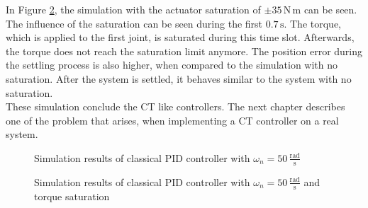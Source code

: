 In Figure \ref{fig:ch3_sim33}, the simulation with the actuator saturation of $\pm 35\,\mathrm{N\,m}$ can be seen. The influence of the saturation can be seen during the first $0.7\,\mathrm{s}$. The torque, which is applied to the first joint, is saturated during this time slot. Afterwards, the torque does not reach the saturation limit anymore. The position error during the settling process is also higher, when compared to the simulation with no saturation. After the system is settled, it behaves similar to the system with no saturation.\\
These simulation conclude the \ac{CT} like controllers. The next chapter describes one of the problem that arises, when implementing a \ac{CT} controller on a real system.
\begin{figure}[H]
	\centering
	
	\caption{Simulation results of classical PID controller with $\omega_n = 50\,\mathrm{\frac{rad}{s}}$}
	\label{fig:ch3_sim32}
\end{figure}
\begin{figure}[H]
	\centering
	
	\caption{Simulation results of classical PID controller with $\omega_n = 50\,\mathrm{\frac{rad}{s}}$ and torque saturation}
	\label{fig:ch3_sim33}
\end{figure}